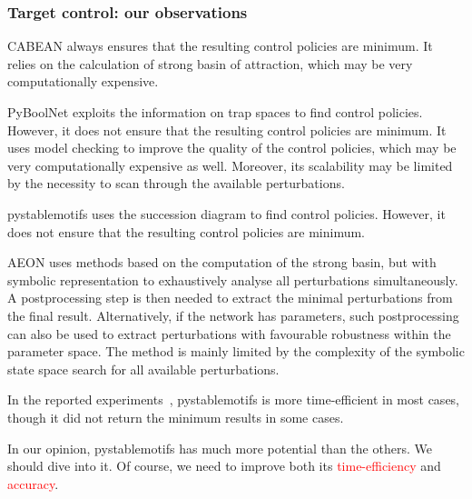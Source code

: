 \documentclass{beamer}              %
\newcommand{\red}[1]{\textcolor{red}{#1}}
\begin{document}
\begin{frame}[allowframebreaks]
  \frametitle{Target control: our observations}

CABEAN always ensures that the resulting control policies are minimum.
It relies on the calculation of strong basin of attraction, which may be very computationally expensive.

\hspace{0.8cm}

PyBoolNet exploits the information on trap spaces to find control policies.
However, it does not ensure that the resulting control policies are minimum.
It uses model checking to improve the quality of the control policies, which may be very computationally expensive as well.
Moreover, its scalability may be limited by the necessity to scan through the available perturbations.

\hspace{0.8cm}

pystablemotifs uses the succession diagram to find control policies.
However, it does not ensure that the resulting control policies are minimum.

\hspace{0.8cm}

AEON uses methods based on the computation of the strong basin, but with symbolic representation to exhaustively analyse all perturbations simultaneously. A postprocessing step is then needed to extract the minimal perturbations from the final result. Alternatively, if the network has parameters, such postprocessing can also be used to extract perturbations with favourable robustness within the parameter space. The method is mainly limited by the complexity of the symbolic state space search for all available perturbations.

\hspace{0.8cm}

In the reported experiments~\cite{DBLP:journals/bioinformatics/SuP21, DBLP:conf/fm/SuP21}, pystablemotifs is more time-efficient in most cases, though it did not return the minimum results in some cases.

\hspace{0.8cm}

In our opinion, pystablemotifs has much more potential than the others.
We should dive into it.
Of course, we need to improve both its \red{time-efficiency} and \red{accuracy}.

\end{frame}
\end{document}

